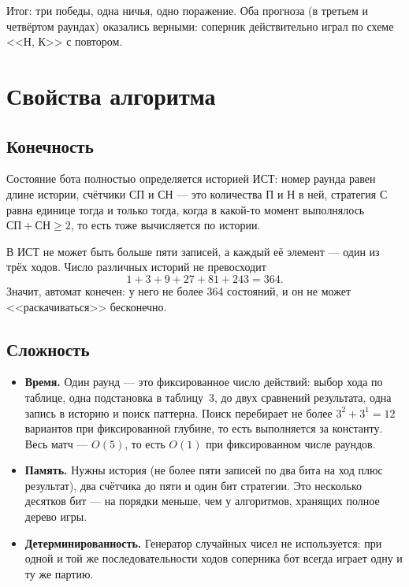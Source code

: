 \documentclass[a4paper,14pt]{extarticle}
\begin{document}
Итог: три победы, одна ничья, одно поражение. Оба прогноза (в третьем и
четвёртом раундах) оказались верными: соперник действительно играл по схеме
<<Н, К>> с повтором.

\section{Свойства алгоритма}

\subsection{Конечность}

Состояние бота полностью определяется историей ИСТ: номер раунда равен длине
истории, счётчики СП и СН --- это количества П и Н в ней, стратегия С равна
единице тогда и только тогда, когда в какой-то момент выполнялось
$\text{СП}+\text{СН}\ge2$, то есть тоже вычисляется по истории.

В ИСТ не может быть больше пяти записей, а каждый её элемент --- один из трёх
ходов. Число различных историй не превосходит
\[
1+3+9+27+81+243 = 364 .
\]
Значит, автомат конечен: у него не более 364 состояний, и он не может
<<раскачиваться>> бесконечно.

\subsection{Сложность}

\begin{itemize}
\item \textbf{Время.} Один раунд --- это фиксированное число действий: выбор
      хода по таблице, одна подстановка в таблицу~3, до двух сравнений
      результата, одна запись в историю и поиск паттерна. Поиск перебирает
      не более $3^2+3^1=12$ вариантов при фиксированной глубине, то есть
      выполняется за константу. Весь матч --- $O(5)$, то есть $O(1)$ при
      фиксированном числе раундов.
\item \textbf{Память.} Нужны история (не более пяти записей по два бита на ход
      плюс результат), два счётчика до пяти и один бит стратегии. Это
      несколько десятков бит --- на порядки меньше, чем у алгоритмов, хранящих
      полное дерево игры.
\item \textbf{Детерминированность.} Генератор случайных чисел не используется:
      при одной и той же последовательности ходов соперника бот всегда играет
      одну и ту же партию.
\end{itemize}
\end{document}
